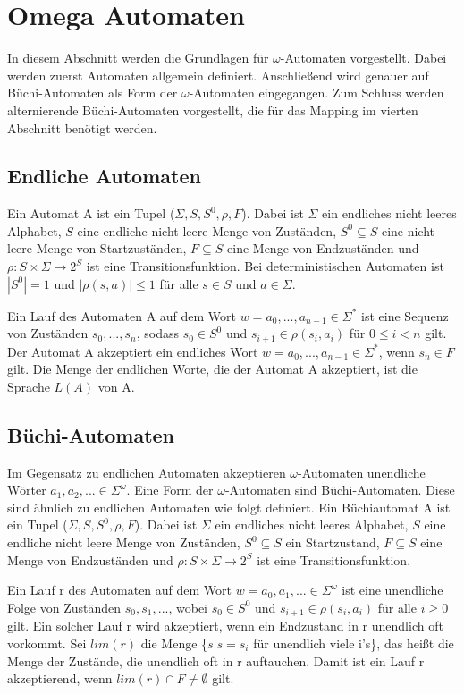 \section{Omega Automaten}

In diesem Abschnitt werden die Grundlagen für $\omega$-Automaten vorgestellt. Dabei werden zuerst Automaten allgemein definiert. Anschließend wird genauer auf Büchi-Automaten als Form der $\omega$-Automaten eingegangen. Zum Schluss werden alternierende Büchi-Automaten vorgestellt, die für das Mapping im vierten Abschnitt benötigt werden. 

\subsection{Endliche Automaten}
Ein Automat A ist ein Tupel ($\Sigma, S, S^0, \rho, F$). Dabei ist $\Sigma$ ein endliches nicht leeres Alphabet, $S$ eine endliche nicht leere Menge von Zuständen, $S^0\subseteq S$ eine nicht leere Menge von Startzuständen, $F\subseteq S$ eine Menge von Endzuständen und $\rho : S \times \Sigma \rightarrow 2^S$ ist eine Transitionsfunktion. Bei deterministischen Automaten ist $|S^0|=1$ und $|\rho(s,a)|\leq 1$ für alle $s\in S$ und $a \in \Sigma$.

Ein Lauf des Automaten A auf dem Wort $w=a_0,...,a_{n-1}\in \Sigma^\ast$ ist eine Sequenz von Zuständen $s_0,...,s_n$, sodass $s_0 \in S^0$ und $s_{i+1} \in \rho(s_i, a_i)$ für $0\leq i<n$ gilt. Der Automat A akzeptiert ein endliches Wort $w=a_0,...,a_{n-1}\in\Sigma^\ast$, wenn $s_n\in F$ gilt. Die Menge der endlichen Worte, die der Automat A akzeptiert, ist die Sprache $L(A)$ von A.

\subsection{Büchi-Automaten}
Im Gegensatz zu endlichen Automaten akzeptieren $\omega$-Automaten unendliche Wörter $a_1,a_2,...\in \Sigma^{\omega}$. Eine Form der $\omega$-Automaten sind Büchi-Automaten. Diese sind ähnlich zu endlichen Automaten wie folgt definiert. Ein Büchiautomat A ist ein Tupel ($\Sigma, S, S^0, \rho, F$). Dabei ist $\Sigma$ ein endliches nicht leeres Alphabet, $S$ eine endliche nicht leere Menge von Zuständen, $S^0\subseteq S$ ein Startzustand, $F\subseteq S$ eine Menge von Endzuständen und $\rho : S \times \Sigma \rightarrow 2^S$ ist eine Transitionsfunktion.

Ein Lauf r des Automaten auf dem Wort $w=a_0,a_1,... \in \Sigma^{\omega}$ ist eine unendliche Folge von Zuständen $s_0,s_1,...$, wobei $s_0 \in S^0$ und $s_{i+1} \in \rho(s_i, a_i)$ für alle $i \geq 0$ gilt. Ein solcher Lauf r wird akzeptiert, wenn ein Endzustand in r unendlich oft vorkommt. Sei $lim(r)$ die Menge \{$s|s=s_i$ für unendlich viele i's\}, das heißt die Menge der Zustände, die unendlich oft in r auftauchen. Damit ist ein Lauf r akzeptierend, wenn $lim(r)\cap F \neq \emptyset$ gilt.

